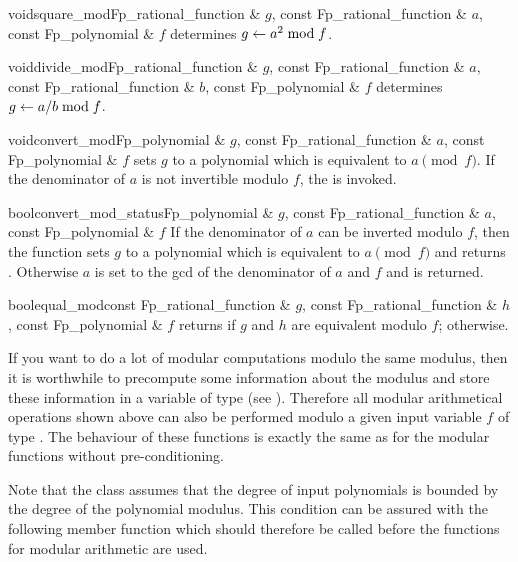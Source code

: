 \begin{fcode}{void}{square_mod}{Fp_rational_function & $g$, const Fp_rational_function & $a$,
    const Fp_polynomial & $f$}%
determines $g \leftarrow a^2 \bmod f$.
\end{fcode}

\begin{fcode}{void}{divide_mod}{Fp_rational_function & $g$, const Fp_rational_function & $a$,
    const Fp_rational_function & $b$, const Fp_polynomial & $f$}
  determines $g \leftarrow a / b \bmod f$.
\end{fcode}

\begin{fcode}{void}{convert_mod}{Fp_polynomial & $g$, const Fp_rational_function & $a$,
    const Fp_polynomial & $f$}%
  sets $g$ to a polynomial which is equivalent to $a \pmod{f}$.  If the denominator of $a$ is
  not invertible modulo $f$, the \LEH is invoked.
\end{fcode}

\begin{fcode}{bool}{convert_mod_status}{Fp_polynomial & $g$, const Fp_rational_function & $a$,
    const Fp_polynomial & $f$}%
  If the denominator of $a$ can be inverted modulo $f$, then the function sets $g$ to a
  polynomial which is equivalent to $a \pmod{f}$ and returns \TRUE.  Otherwise $a$ is set to the
  gcd of the denominator of $a$ and $f$ and \FALSE is returned.
\end{fcode}

\begin{fcode}{bool}{equal_mod}{const Fp_rational_function & $g$,
    const Fp_rational_function & $h$, const Fp_polynomial & $f$}%
  returns \TRUE if $g$ and $h$ are equivalent modulo $f$; \FALSE otherwise.
\end{fcode}



If you want to do a lot of modular computations modulo the same modulus, then it is worthwhile
to precompute some information about the modulus and store these information in a variable of
type  (see ).  Therefore all modular arithmetical
operations shown above can also be performed modulo a given input variable $f$ of type
.  The behaviour of these functions is exactly the same as for the modular
functions without pre-conditioning.

Note that the class  assumes that the degree of input polynomials is bounded
by the degree of the polynomial modulus.  This condition can be assured with the following
member function which should therefore be called before the functions for modular arithmetic are
used.

